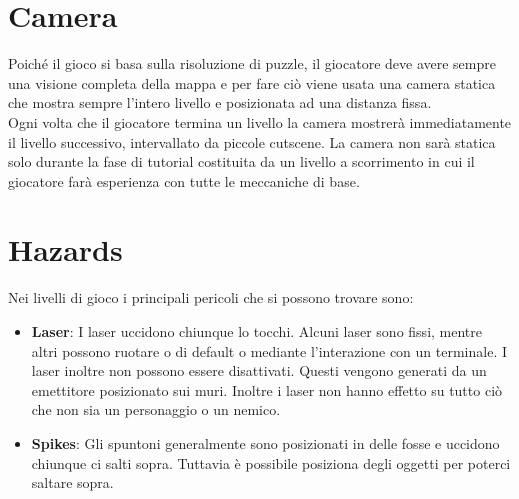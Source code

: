 \documentclass[12pt, a4paper]{report}
\begin{document}
\section*{Camera}
Poiché il gioco si basa sulla risoluzione di puzzle, il giocatore deve avere sempre una visione completa della mappa e per fare ciò viene usata una camera statica che mostra sempre l'intero livello e posizionata ad una distanza fissa.\\
Ogni volta che il giocatore termina un livello la camera mostrerà immediatamente il livello successivo, intervallato da piccole cutscene. La camera non sarà statica solo durante la fase di tutorial costituita da un livello a scorrimento in cui il giocatore farà esperienza con tutte le meccaniche di base.

\section*{Hazards}
Nei livelli di gioco i principali pericoli che si possono trovare sono:
\begin{itemize}
	\item \textbf{Laser}: I laser uccidono chiunque lo tocchi. Alcuni laser sono fissi, mentre altri possono ruotare o di default o mediante l'interazione con un terminale. I laser inoltre non possono essere disattivati. Questi vengono generati da un emettitore posizionato sui muri. Inoltre i laser non hanno effetto su tutto ciò che non sia un personaggio o un nemico.
	\item \textbf{Spikes}: Gli spuntoni generalmente sono posizionati in delle fosse e uccidono chiunque ci salti sopra. Tuttavia è possibile posiziona degli oggetti per poterci saltare sopra.
\end{itemize}
\end{document}
